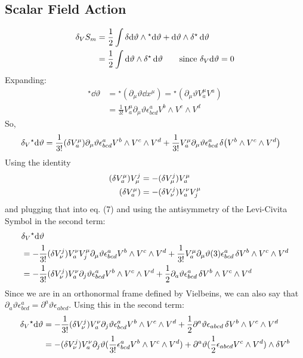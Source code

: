 \documentclass[12pt]{article}
\newcommand{\hodge}{{^\star}}
\begin{document}
\subsection{Scalar Field Action}
\begin{align}
  \var_V{S_m} &= \frac{1}{2} \int \var\dd\vartheta \wedge \hodge\dd\vartheta + \dd\vartheta \wedge \var\hodge\dd\vartheta \nonumber \\
  &=  \frac{1}{2} \int \dd\vartheta \wedge \var\hodge\dd\vartheta \qquad \text{since } \var_V\dd\vartheta = 0 
\end{align}
Expanding:
\begin{align*}
  \hodge\dd\vartheta &= \hodge(\partial_\mu\vartheta \dd x^\mu) = \hodge(\partial_\mu\vartheta V^\mu_a V^a)\\ 
  &= \frac{1}{3!} V^\mu_a \partial_\mu\vartheta \epsilon^a_{bcd}V^b \wedge V^c \wedge V^d
\end{align*}
So,
\begin{align}
  \var_V\hodge\dd\vartheta &= \frac{1}{3!}(\var V^\mu_a)\partial_\mu\vartheta \epsilon^a_{bcd} V^b \wedge V^c \wedge V^d + \frac{1}{3!} V^\mu_a \partial_\mu\vartheta \epsilon^a_{bcd}\var(V^b \wedge V^c \wedge V^d)
\end{align}
Using the identity
\begin{align*}
  (\var V^\mu_a)V^j_\mu &= -(\var V^j_\mu)V^\mu_a \\
  (\var V^\mu_a) &= -(\var V^j_\nu)V^\nu_a V_j^\mu
\end{align*}
and plugging that into eq. (7) and using the antisymmetry of the Levi-Civita Symbol in the second term:
\begin{align*}
  &\var_V\hodge\dd\vartheta \\ &= -\frac{1}{3!}(\var V^j_\nu)V^\nu_a V_j^\mu \partial_\mu\vartheta \epsilon^a_{bcd}V^b \wedge V^c \wedge V^d + \frac{1}{3!} V^\mu_a \partial_\mu\vartheta (3)\epsilon^a_{bcd}\var{V^b} \wedge V^c \wedge V^d \\
  &= -\frac{1}{3!}(\var V^j_\nu)V^\nu_a \partial_j\vartheta \epsilon^a_{bcd}V^b \wedge V^c \wedge V^d + \frac{1}{2} \partial_a\vartheta \epsilon^a_{bcd}\var{V^b} \wedge V^c \wedge V^d
\end{align*}
Since we are in an orthonormal frame defined by Vielbeins, we can also say that $\partial_a\vartheta \epsilon^a_{bcd} = \partial^a\vartheta \epsilon_{abcd}$. Using this in the second term:
\begin{align*}
  \var_V\hodge\dd\vartheta &= -\frac{1}{3!}(\var V^j_\nu)V^\nu_a \partial_j\vartheta \epsilon^a_{bcd}V^b \wedge V^c \wedge V^d + \frac{1}{2} \partial^a\vartheta \epsilon_{abcd}\var{V^b} \wedge V^c \wedge V^d \\
  &= -(\var V^j_\nu)V^\nu_a \partial_j\vartheta (\frac{1}{3!} \epsilon^a_{bcd}V^b \wedge V^c \wedge V^d) + \partial^a\vartheta (\frac{1}{2} \epsilon_{abcd} V^c \wedge V^d) \wedge \var{V^b}
\end{align*}
\end{document}
